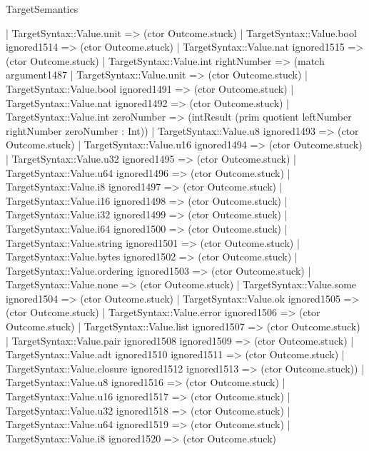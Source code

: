 \begin{lexlean}{TargetSemantics}
\begin{semanticmodule}
{                | TargetSyntax::Value.unit => (ctor Outcome.stuck)
                | TargetSyntax::Value.bool ignored1514 => (ctor Outcome.stuck)
                | TargetSyntax::Value.nat ignored1515 => (ctor Outcome.stuck)
                | TargetSyntax::Value.int rightNumber => (match argument1487
                  | TargetSyntax::Value.unit => (ctor Outcome.stuck)
                  | TargetSyntax::Value.bool ignored1491 => (ctor Outcome.stuck)
                  | TargetSyntax::Value.nat ignored1492 => (ctor Outcome.stuck)
                  | TargetSyntax::Value.int zeroNumber => (intResult (prim quotient leftNumber rightNumber zeroNumber : Int))
                  | TargetSyntax::Value.u8 ignored1493 => (ctor Outcome.stuck)
                  | TargetSyntax::Value.u16 ignored1494 => (ctor Outcome.stuck)
                  | TargetSyntax::Value.u32 ignored1495 => (ctor Outcome.stuck)
                  | TargetSyntax::Value.u64 ignored1496 => (ctor Outcome.stuck)
                  | TargetSyntax::Value.i8 ignored1497 => (ctor Outcome.stuck)
                  | TargetSyntax::Value.i16 ignored1498 => (ctor Outcome.stuck)
                  | TargetSyntax::Value.i32 ignored1499 => (ctor Outcome.stuck)
                  | TargetSyntax::Value.i64 ignored1500 => (ctor Outcome.stuck)
                  | TargetSyntax::Value.string ignored1501 => (ctor Outcome.stuck)
                  | TargetSyntax::Value.bytes ignored1502 => (ctor Outcome.stuck)
                  | TargetSyntax::Value.ordering ignored1503 => (ctor Outcome.stuck)
                  | TargetSyntax::Value.none => (ctor Outcome.stuck)
                  | TargetSyntax::Value.some ignored1504 => (ctor Outcome.stuck)
                  | TargetSyntax::Value.ok ignored1505 => (ctor Outcome.stuck)
                  | TargetSyntax::Value.error ignored1506 => (ctor Outcome.stuck)
                  | TargetSyntax::Value.list ignored1507 => (ctor Outcome.stuck)
                  | TargetSyntax::Value.pair ignored1508 ignored1509 => (ctor Outcome.stuck)
                  | TargetSyntax::Value.adt ignored1510 ignored1511 => (ctor Outcome.stuck)
                  | TargetSyntax::Value.closure ignored1512 ignored1513 => (ctor Outcome.stuck))
                | TargetSyntax::Value.u8 ignored1516 => (ctor Outcome.stuck)
                | TargetSyntax::Value.u16 ignored1517 => (ctor Outcome.stuck)
                | TargetSyntax::Value.u32 ignored1518 => (ctor Outcome.stuck)
                | TargetSyntax::Value.u64 ignored1519 => (ctor Outcome.stuck)
                | TargetSyntax::Value.i8 ignored1520 => (ctor Outcome.stuck)
}
\end{semanticmodule}
\end{lexlean}
